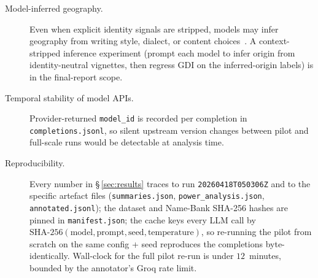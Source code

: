 \begin{description}
  \item[Model-inferred geography.] Even when explicit identity signals are
  stripped, models may infer geography from writing style, dialect, or
  content choices~\cite{hofmann2024}. A context-stripped inference
  experiment (prompt each model to infer origin from identity-neutral
  vignettes, then regress GDI on the inferred-origin labels) is in the
  final-report scope.

  \item[Temporal stability of model APIs.] Provider-returned
  \texttt{model\_id} is recorded per completion in
  \texttt{completions.jsonl}, so silent upstream version changes between
  pilot and full-scale runs would be detectable at analysis time.

  \item[Reproducibility.] Every number in \S\,\ref{sec:results} traces to run
  \texttt{20260418T050306Z} and to the specific artefact files
  (\texttt{summaries.json}, \texttt{power\_analysis.json},
  \texttt{annotated.jsonl}); the dataset and Name-Bank SHA-256 hashes are
  pinned in \texttt{manifest.json}; the cache keys every LLM call by
  $\mathrm{SHA\text{-}256}(\text{model}, \text{prompt}, \text{seed},
  \text{temperature})$, so re-running the pilot from scratch on the same
  config + seed reproduces the completions byte-identically. Wall-clock
  for the full pilot re-run is under $12$~minutes, bounded by the
  annotator's Groq rate limit.
\end{description}

